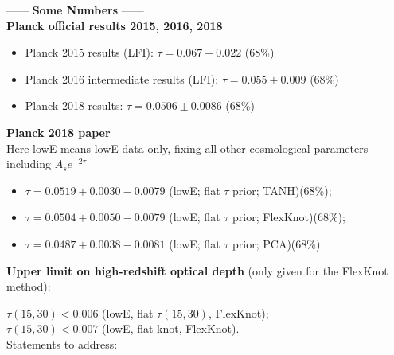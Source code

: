 \documentclass[prd,twocolumn,amsmath,amssymb,floatfix,superscriptaddress,nofootinbib]{revtex4-1}
\begin{document}
------ \textbf{Some Numbers} ------ \\

\textbf{Planck official results 2015, 2016, 2018} \\

\begin{itemize}
    
    \item Planck 2015 results (LFI): $\tau = 0.067 \pm 0.022$ (68\%) \\

    \item Planck 2016  intermediate results (LFI): $\tau = 0.055 \pm 0.009$ (68\%) \\
    
    \item Planck 2018 results: $\tau = 0.0506 \pm 0.0086$ (68\%) \\

\end{itemize}

\textbf{Planck 2018 paper} \\

Here lowE means lowE data only, fixing all other cosmological parameters including $A_s e^{-2\tau}$\\

\begin{itemize}

\item $\tau = 0.0519+0.0030-0.0079$ (lowE; flat $\tau$ prior; TANH)(68\%); \\

\item $\tau = 0.0504+0.0050
-0.0079$ (lowE; flat $\tau$ prior; FlexKnot)(68\%); \\

\item $\tau = 0.0487+0.0038
-0.0081$ (lowE; flat $\tau$ prior; PCA)(68\%).

\end{itemize}

\textbf{Upper limit on high-redshift optical depth} (only given for the FlexKnot method):

$\tau(15, 30) < 0.006$ (lowE, flat $\tau(15, 30)$, FlexKnot); \\

$\tau(15, 30) < 0.007$ (lowE, flat knot, FlexKnot).\\

Statements to address:
\end{document}
